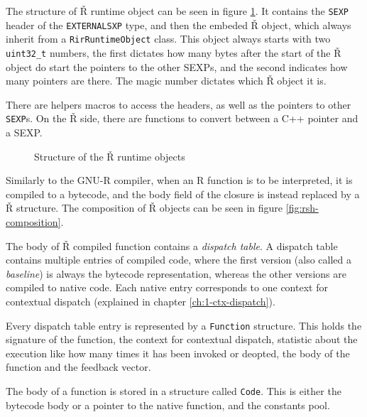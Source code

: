 The structure of Ř runtime object can be seen in figure \ref{fig:rsh-object-struct}. It contains the \texttt{SEXP} header of the \texttt{EXTERNALSXP} type, and then the embeded Ř object, which always inherit from a \texttt{RirRuntimeObject} class. This object always starts with two \texttt{uint32\_t} numbers, the first dictates how many bytes after the start of the Ř object do start the pointers to the other SEXPs, and the second indicates how many pointers are there. The magic number dictates which Ř object it is.

There are helpers macros to access the headers, as well as the pointers to other \texttt{SEXP}s. On the Ř side, there are functions to convert between a C++ pointer and a SEXP.

\begin{figure}
	\centering
	\begin{adjustbox}{trim=10 80pt 0 0, clip}
	\end{adjustbox}
	\caption{Structure of the Ř runtime objects}\label{fig:rsh-object-struct}
\end{figure}

Similarly to the GNU-R compiler, when an R function is to be interpreted, it is compiled to a bytecode, and the body field of the closure is instead replaced by a Ř structure. The composition of Ř objects can be seen in figure \ref{fig:rsh-composition}.

The body of Ř compiled function contains a \textit{dispatch table}. A dispatch table contains multiple entries of compiled code, where the first version (also called a \textit{baseline}) is always the bytecode representation, whereas the other versions are compiled to native code. Each native entry corresponds to one context for contextual dispatch (explained in chapter \ref{ch:1-ctx-dispatch}).

Every dispatch table entry is represented by a \texttt{Function} structure. This holds the signature of the function, the context for contextual dispatch, statistic about the execution like how many times it has been invoked or deopted, the body of the function and the feedback vector.

The body of a function is stored in a structure called \texttt{Code}. This is either the bytecode body or a pointer to the native function, and the constants pool.

